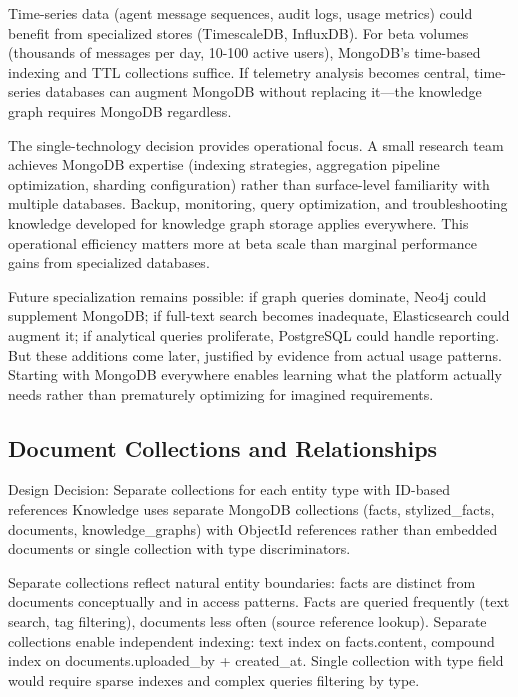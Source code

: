 \documentclass[12pt,a4paper]{article}
\begin{document}
Time-series data (agent message sequences, audit logs, usage metrics) could benefit from specialized stores (TimescaleDB, InfluxDB). For beta volumes (thousands of messages per day, 10-100 active users), MongoDB's time-based indexing and TTL collections suffice. If telemetry analysis becomes central, time-series databases can augment MongoDB without replacing it—the knowledge graph requires MongoDB regardless.

The single-technology decision provides operational focus. A small research team achieves MongoDB expertise (indexing strategies, aggregation pipeline optimization, sharding configuration) rather than surface-level familiarity with multiple databases. Backup, monitoring, query optimization, and troubleshooting knowledge developed for knowledge graph storage applies everywhere. This operational efficiency matters more at beta scale than marginal performance gains from specialized databases.

Future specialization remains possible: if graph queries dominate, Neo4j could supplement MongoDB; if full-text search becomes inadequate, Elasticsearch could augment it; if analytical queries proliferate, PostgreSQL could handle reporting. But these additions come later, justified by evidence from actual usage patterns. Starting with MongoDB everywhere enables learning what the platform actually needs rather than prematurely optimizing for imagined requirements.

\subsection{Document Collections and Relationships}

\begin{rationale}{Design Decision: Separate collections for each entity type with ID-based references}
Knowledge uses separate MongoDB collections (facts, stylized\_facts, documents, knowledge\_graphs) with ObjectId references rather than embedded documents or single collection with type discriminators.
\end{rationale}

Separate collections reflect natural entity boundaries: facts are distinct from documents conceptually and in access patterns. Facts are queried frequently (text search, tag filtering), documents less often (source reference lookup). Separate collections enable independent indexing: text index on facts.content, compound index on documents.uploaded\_by + created\_at. Single collection with type field would require sparse indexes and complex queries filtering by type.
\end{document}
